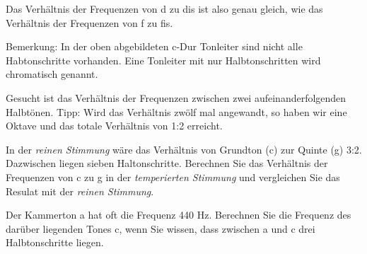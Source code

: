 Das Verhältnis der Frequenzen von d zu dis ist also genau gleich, wie
das Verhältnis der Frequenzen von f zu fis.

Bemerkung:  In der oben
abgebildeten c-Dur Tonleiter sind nicht alle Habtonschritte
vorhanden. Eine Tonleiter mit nur Halbtonschritten wird chromatisch
genannt.

\begin{bbwAufgabenBlock}

\item Gesucht ist das Verhältnis der Frequenzen zwischen zwei aufeinanderfolgenden Halbtönen. Tipp: Wird
  das Verhältnis zwölf mal angewandt, so haben wir eine Oktave und das
  totale Verhältnis von 1:2 erreicht.


\item In der \textit{reinen Stimmung} wäre das Verhältnis von Grundton
  (c) zur Quinte (g) 3:2. Dazwischen liegen sieben
  Haltonschritte. Berechnen Sie das Verhältnis der Frequenzen von c zu
  g in der \textit{temperierten Stimmung} und vergleichen Sie das
  Resulat mit der \textit{reinen Stimmung}.

  


\item Der Kammerton a hat oft die Frequenz 440 Hz. Berechnen Sie die
  Frequenz des darüber liegenden Tones c, wenn Sie wissen, dass
  zwischen a und c drei Halbtonschritte liegen.


    
\end{bbwAufgabenBlock}
\platzFuerBerechnungenBisEndeSeite{}


\newpage
